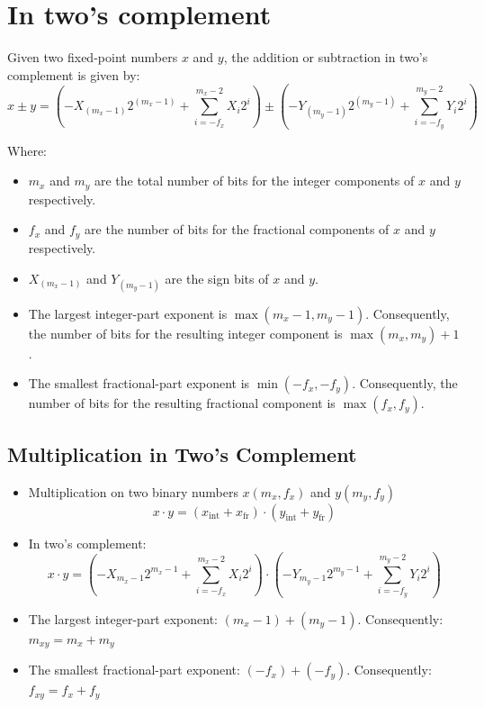 \documentclass[12pt,openany, tikz,border=10pt]{book}
\begin{document}
 \newpage
\section{In two's complement}
Given two fixed-point numbers $x$ and $y$, the addition or subtraction in two's complement is given by:
\begin{equation}
x \pm y = \left( -X_{(m_x-1)}2^{(m_x-1)} + \sum_{i=-f_x}^{m_x-2} X_i2^i \right) \pm \left( -Y_{(m_y-1)}2^{(m_y-1)} + \sum_{i=-f_y}^{m_y-2} Y_i2^i \right)
\end{equation}

Where:
\begin{itemize}
    \item[] $m_x$ and $m_y$ are the total number of bits for the integer components of $x$ and $y$ respectively.
    \item[] $f_x$ and $f_y$ are the number of bits for the fractional components of $x$ and $y$ respectively.
    \item[] $X_{(m_x-1)}$ and $Y_{(m_y-1)}$ are the sign bits of $x$ and $y$.
    \item[] The largest integer-part exponent is $\max(m_x - 1, m_y - 1)$. Consequently, the number of bits for the resulting integer component is $\max(m_x, m_y) + 1$.
    \item[] The smallest fractional-part exponent is $\min(-f_x, -f_y)$. Consequently, the number of bits for the resulting fractional component is $\max(f_x, f_y)$.
\end{itemize}


\subsection*{Multiplication in Two's Complement}
\begin{itemize}
    \item[] Multiplication on two binary numbers \( x(m_x, f_x) \) and \( y(m_y, f_y) \)
    \begin{equation*}
      x \cdot y = (x_{\text{int}} + x_{\text{fr}}) \cdot (y_{\text{int}} + y_{\text{fr}})
    \end{equation*}
  
    \item[] In two's complement:
    \begin{equation*}
      x \cdot y = \left( -X_{m_x-1}2^{m_x-1} + \sum_{i=-f_x}^{m_x-2} X_i2^i \right) \cdot \left( -Y_{m_y-1}2^{m_y-1} + \sum_{i=-f_y}^{m_y-2} Y_i2^i \right)
    \end{equation*}
    
    \item[] \small The largest integer-part exponent: \( (m_x - 1) + (m_y - 1) \). Consequently: \( m_{xy} = m_x + m_y \)
    
    \item[] \small The smallest fractional-part exponent: \( (-f_x) + (-f_y) \). Consequently: \( f_{xy} = f_x + f_y \)
    
  \end{itemize}
\end{document}
